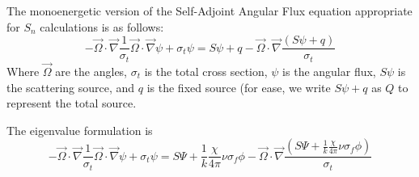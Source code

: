 The monoenergetic version of the Self-Adjoint Angular Flux equation appropriate for $S_n$ calculations is as follows:
\begin{equation}
    - \vec{\Omega} \cdot \vec{\nabla}\frac{1}{\sigma_t}\vec{\Omega} \cdot \vec{\nabla} \psi + \sigma_t \psi = S\psi + q - \vec{\Omega} \cdot \vec{\nabla} \frac{(S\psi + q)}{\sigma_t}
    \label{eq:SAAF}
\end{equation}
Where $\vec{\Omega}$ are the angles, $\sigma_t$ is the total cross section, $\psi$ is the angular flux, $S\psi$ is the scattering source, and $q$ is the fixed source (for ease, we write $S\psi + q$ as $Q$ to represent the total source.

The eigenvalue formulation is
\begin{equation}
        - \vec{\Omega} \cdot \vec{\nabla}\frac{1}{\sigma_t}\vec{\Omega} \cdot \vec{\nabla} \psi + \sigma_t \psi = S\Psi + \frac{1}{k}\frac{\chi}{4\pi}\nu\sigma_f\phi - \vec{\Omega} \cdot \vec{\nabla} \frac{(S\Psi + \frac{1}{k}\frac{\chi}{4\pi}\nu\sigma_f\phi)}{\sigma_t}
    \label{eq:SAAF-eigenvalue}
\end{equation}